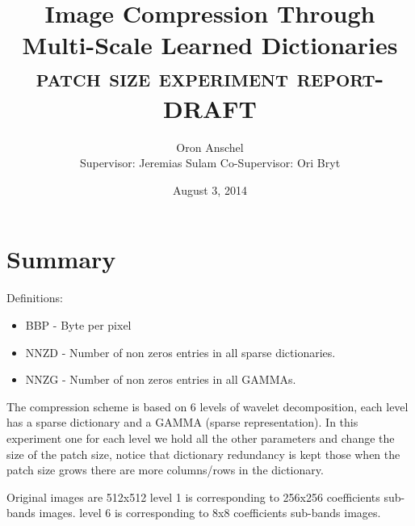 \documentclass{article}
\begin{document}
\title{\huge Image Compression Through Multi-Scale Learned Dictionaries \\  { \large  \textsc{patch size experiment report-DRAFT}}}
\date{August 3, 2014}

\author{{\Large Oron Anschel}\vspace{0.2cm}   \\ {Supervisor}: Jeremias Sulam \hspace{2cm} Co-Supervisor: Ori Bryt }


\maketitle
\nopagebreak

\section{Summary}
Definitions:
\begin{itemize}
\item BBP  - Byte per pixel 
\item NNZD - Number of non zeros entries in all sparse dictionaries.
\item NNZG - Number of non zeros entries in all GAMMAs.
\end{itemize}

The compression scheme is based on 6 levels of wavelet decomposition, each level has a sparse dictionary and a GAMMA (sparse representation).
In this experiment one for each level we hold all the other parameters and change the size of the patch size, notice that dictionary redundancy is kept those when the patch size grows there are more columns/rows in the dictionary.

Original images are 512x512
level 1 is corresponding to 256x256 coefficients sub-bands images.
level 6 is corresponding to 8x8     coefficients sub-bands images.
\newpage 
\end{document}
